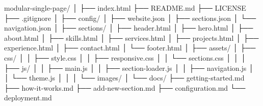 
modular-single-page/
│
├── index.html
├── README.md
├── LICENSE
├── .gitignore
│
├── config/
│   ├── website.json
│   ├── sections.json
│   └── navigation.json
│
├── sections/
│   ├── header.html
│   ├── hero.html
│   ├── about.html
│   ├── skills.html
│   ├── services.html
│   ├── projects.html
│   ├── experience.html
│   ├── contact.html
│   └── footer.html
│
├── assets/
│   ├── css/
│   │   ├── style.css
│   │   ├── responsive.css
│   │   └── sections.css
│   │
│   ├── js/
│   │   ├── main.js
│   │   ├── section-loader.js
│   │   ├── navigation.js
│   │   └── theme.js
│   │
│   └── images/
│
└── docs/
    ├── getting-started.md
    ├── how-it-works.md
    ├── add-new-section.md
    ├── configuration.md
    └── deployment.md